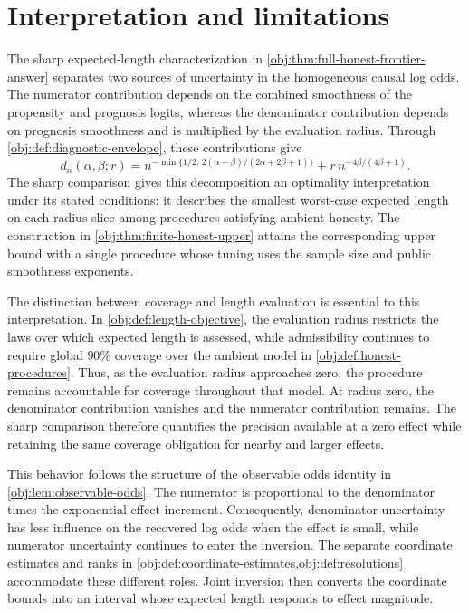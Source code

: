 \section{Interpretation and limitations}

The sharp expected-length characterization in \cref{obj:thm:full-honest-frontier-answer} separates two sources of uncertainty in the homogeneous causal log odds. The numerator contribution depends on the combined smoothness of the propensity and prognosis logits, whereas the denominator contribution depends on prognosis smoothness and is multiplied by the evaluation radius. Through \cref{obj:def:diagnostic-envelope}, these contributions give
\[
d_n(\alpha,\beta;r)
=
n^{-\min\{1/2,\,2(\alpha+\beta)/(2\alpha+2\beta+1)\}}
+
r\,n^{-4\beta/(4\beta+1)}.
\]
The sharp comparison gives this decomposition an optimality interpretation under its stated conditions: it describes the smallest worst-case expected length on each radius slice among procedures satisfying ambient honesty. The construction in \cref{obj:thm:finite-honest-upper} attains the corresponding upper bound with a single procedure whose tuning uses the sample size and public smoothness exponents.

The distinction between coverage and length evaluation is essential to this interpretation. In \cref{obj:def:length-objective}, the evaluation radius restricts the laws over which expected length is assessed, while admissibility continues to require global \(90\%\) coverage over the ambient model in \cref{obj:def:honest-procedures}. Thus, as the evaluation radius approaches zero, the procedure remains accountable for coverage throughout that model. At radius zero, the denominator contribution vanishes and the numerator contribution remains. The sharp comparison therefore quantifies the precision available at a zero effect while retaining the same coverage obligation for nearby and larger effects.

This behavior follows the structure of the observable odds identity in \cref{obj:lem:observable-odds}. The numerator is proportional to the denominator times the exponential effect increment. Consequently, denominator uncertainty has less influence on the recovered log odds when the effect is small, while numerator uncertainty continues to enter the inversion. The separate coordinate estimates and ranks in \cref{obj:def:coordinate-estimates,obj:def:resolutions} accommodate these different roles. Joint inversion then converts the coordinate bounds into an interval whose expected length responds to effect magnitude.

